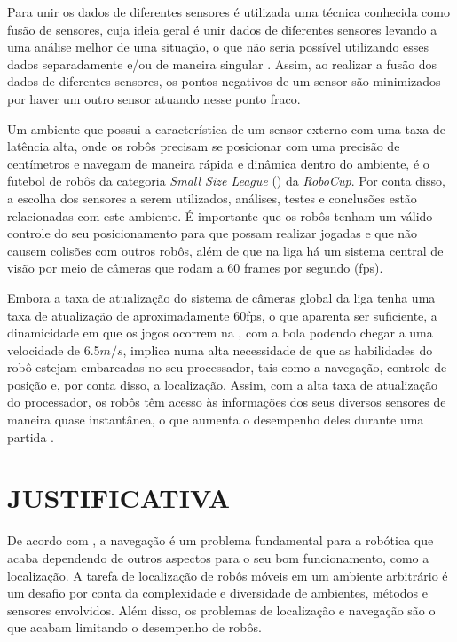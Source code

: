 \documentclass[acronym, symbols, table, deposito]{fei}
\begin{document}
	Para unir os dados de diferentes sensores é utilizada uma técnica conhecida como fusão de sensores, cuja ideia geral é unir dados de diferentes sensores levando a uma análise melhor de uma situação, o que não seria possível utilizando esses dados separadamente e/ou de maneira singular \cite{s16101569}. Assim, ao realizar a fusão dos dados de diferentes sensores, os pontos negativos de um sensor são minimizados por haver um outro sensor atuando nesse ponto fraco.
	
	Um ambiente que possui a característica de um sensor externo com uma taxa de latência alta, onde os robôs precisam se posicionar com uma precisão de centímetros e navegam de maneira rápida e dinâmica dentro do ambiente, é o futebol de robôs da categoria \textit{Small Size League} () da \textit{RoboCup}. Por conta disso, a escolha dos sensores a serem utilizados, análises, testes e conclusões estão relacionadas com este ambiente. É importante que os robôs tenham um válido controle do seu posicionamento para que possam realizar jogadas e que não causem colisões com outros robôs, além de que na liga há um sistema central de visão por meio de câmeras que rodam a 60 frames por segundo (fps).
	
	Embora a taxa de atualização do sistema de câmeras global da liga tenha uma taxa de atualização de aproximadamente 60fps, o que aparenta ser suficiente, a dinamicidade em que os jogos ocorrem na , com a bola podendo chegar a uma velocidade de 6.5$m/s$, implica numa alta necessidade de que as habilidades do robô estejam embarcadas no seu processador, tais como a navegação, controle de posição e, por conta disso, a localização. Assim, com a alta taxa de atualização do processador, os robôs têm acesso às informações dos seus diversos sensores de maneira quase instantânea, o que aumenta o desempenho deles durante uma partida \cite{ubc_thunderbots_2015}.
	
	\section{JUSTIFICATIVA}
	
	De acordo com \textcite{alatise2020review}, a navegação é um problema fundamental para a robótica que acaba dependendo de outros aspectos para o seu bom funcionamento, como a localização. A tarefa de localização de robôs móveis em um ambiente arbitrário é um desafio por conta da complexidade e diversidade de ambientes, métodos e sensores envolvidos. Além disso, os problemas de localização e navegação são o que acabam limitando o desempenho de robôs.
	
\end{document}
